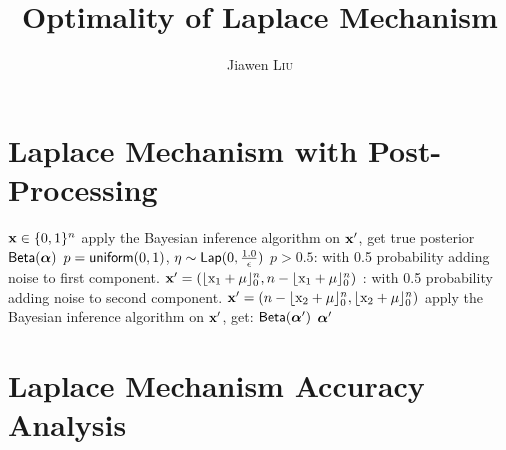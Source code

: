 \documentclass{article}
\begin{document}
\title{Optimality of Laplace Mechanism}

\author{Jiawen \textsc{Liu}} %

\maketitle

\section{Laplace Mechanism with Post-Processing}

\begin{algorithm}
  \caption{$\lapmech$}
  \label{lapmech}
  \begin{algorithmic}
  	\REQUIRE $\textbf{x} \in \{0 ,1 \}^n$
	\STATE \quad apply the Bayesian inference algorithm on $\textbf{x}'$, get true posterior $\mathsf{Beta}(\boldsymbol{\alpha})$
  	\STATE {} $p = \mathsf{uniform}(0, 1)$, $\eta \sim \mathsf{Lap}(0, \frac{1.0}{\epsilon})$
  	\STATE {} $p >0.5$: 
  	\STATE \quad \quad with 0.5 probability adding noise to first component.
  	\STATE \quad \quad  $\textbf{x}' = (\lfloor \text{x}_1 + \mu \rfloor_0^n, n - \lfloor \text{x}_1 + \mu \rfloor_0^n)$ 
  	\STATE {}: 
  	\STATE \quad \quad with 0.5 probability adding noise to second component.
  	\STATE \quad \quad  $\textbf{x}' = (n - \lfloor \text{x}_2 + \mu \rfloor_0^n, \lfloor \text{x}_2 + \mu \rfloor_0^n)$ 
	\STATE \quad apply the Bayesian inference algorithm on $\textbf{x}'$, get: $\mathsf{Beta}(\boldsymbol{\alpha}')$
	\RETURN $\boldsymbol{\alpha}'$
  \end{algorithmic}
\end{algorithm}



\newpage
\section{Laplace Mechanism Accuracy Analysis}
\label{sec_fullacc}
\end{document}

